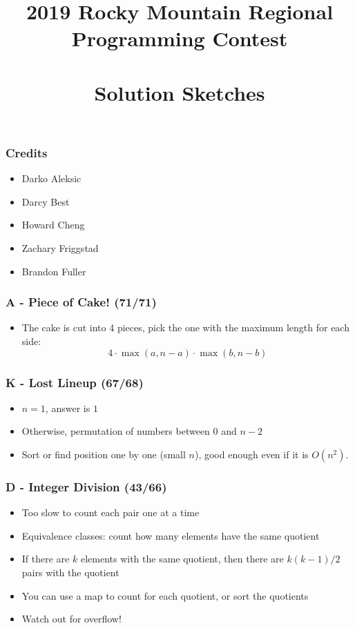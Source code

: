 \documentclass{beamer}
\title[RMRC 2019 Solution Sketches]
{2019 Rocky Mountain Regional \\ Programming Contest \\ \ \\ Solution Sketches}
\date
{}
\begin{document}
\begin{frame}
\titlepage
\end{frame}
\begin{frame}
\frametitle{Credits}
\begin{itemize}
  \setlength\itemsep{0.5\baselineskip}
\item Darko Aleksic
\item Darcy Best
\item Howard Cheng
\item Zachary Friggstad
\item Brandon Fuller
\end{itemize}
\end{frame}


\begin{frame}
\frametitle{A - Piece of Cake! (71/71)}
\begin{itemize}
\setlength\itemsep{0.5\baselineskip}
\item The cake is cut into 4 pieces, pick the one with the maximum length for each side:
\[ 4 \cdot \max(a, n-a) \cdot \max(b, n-b) \]
\end{itemize}
\end{frame}


\begin{frame}
\frametitle{K - Lost Lineup (67/68)}
\begin{itemize}
\setlength\itemsep{0.5\baselineskip}
\item $n=1$, answer is $1$
\item Otherwise, permutation of numbers between $0$ and $n-2$
\item Sort or find position one by one (small $n$), good enough even if it
  is $O(n^2)$.
\end{itemize}
\end{frame}

\begin{frame}
\frametitle{D - Integer Division (43/66)}
\begin{itemize}
  \setlength\itemsep{0.5\baselineskip}
\item Too slow to count each pair one at a time
\item Equivalence classes: count how many elements have the same
  quotient
\item If there are $k$ elements with the same quotient, then there
  are $k(k-1)/2$ pairs with the quotient
\item You can use a map to count for each quotient, or sort the quotients
\item Watch out for overflow!
\end{itemize}
\end{frame}
\end{document}
